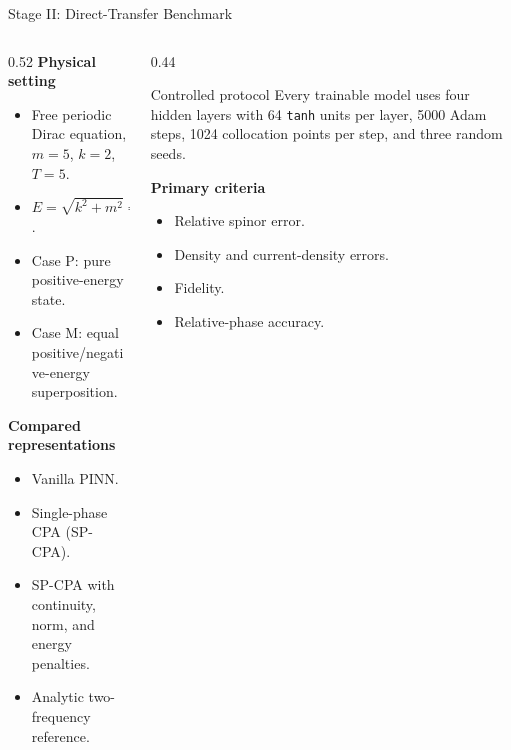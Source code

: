 \documentclass[aspectratio=169,10pt]{beamer}
\begin{document}
\begin{frame}{Stage II: Direct-Transfer Benchmark}
\begin{columns}[T,onlytextwidth]
\begin{column}{0.52\textwidth}
\textbf{Physical setting}
\begin{itemize}
  \item Free periodic Dirac equation, \(m=5\), \(k=2\), \(T=5\).
  \item \(E=\sqrt{k^2+m^2}=\sqrt{29}\approx5.385\).
  \item Case P: pure positive-energy state.
  \item Case M: equal positive/negative-energy superposition.
\end{itemize}

\textbf{Compared representations}
\begin{itemize}
  \item Vanilla PINN.
  \item Single-phase CPA (SP-CPA).
  \item SP-CPA with continuity, norm, and energy penalties.
  \item Analytic two-frequency reference.
\end{itemize}
\end{column}
\begin{column}{0.44\textwidth}
\begin{block}{Controlled protocol}
Every trainable model uses four hidden layers with 64 \texttt{tanh} units per
layer, 5000 Adam steps, 1024 collocation points per step, and three random
seeds.
\end{block}
\textbf{Primary criteria}
\begin{itemize}
  \item Relative spinor error.
  \item Density and current-density errors.
  \item Fidelity.
  \item Relative-phase accuracy.
\end{itemize}
\end{column}
\end{columns}
\end{frame}
\end{document}
